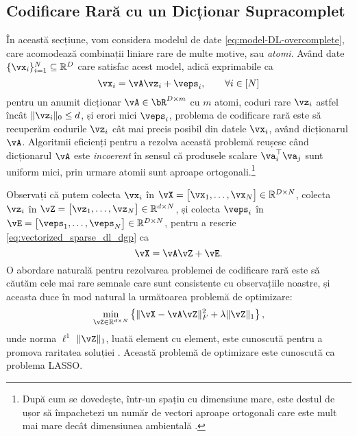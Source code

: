 \documentclass[../../book-main_ro.tex]{subfiles}
\begin{document}
\subsection{Codificare Rară cu un Dicționar Supracomplet} 

În această secțiune, vom considera modelul de date
\eqref{eq:model-DL-overcomplete}, care acomodează combinații liniare rare
de multe motive, sau \textit{atomi}. Având date \(\{\vx_{i}\}_{i = 1}^{N} \subseteq
\R^{D}\) care satisfac acest model, adică exprimabile ca
\begin{equation}\label{eq:vectorized_sparse_dl_dgp}
    \vx_{i} = \vA\vz_{i} + \veps_{i}, \qquad \forall i \in [N]
\end{equation}
pentru un anumit dicționar $\vA \in \bR^{D \times m}$ cu $m$ atomi, coduri rare
$\vz_i$ astfel încât $\norm{\vz_i}_0 \leq d$, și erori mici $\veps_i$,
problema de codificare rară este să recuperăm codurile $\vz_i$ cât mai precis
posibil din datele $\vx_i$, având dicționarul $\vA$.
Algoritmii eficienți pentru a rezolva această problemă reușesc când
dicționarul \(\vA\) este \textit{incoerent} în sensul că produsele
scalare \(\va_{i}^{\top}\va_{j}\) sunt uniform mici, prin urmare atomii sunt
aproape ortogonali.\footnote{După cum se dovedește, într-un spațiu cu dimensiune mare, este
destul de ușor să împachetezi un număr de vectori aproape ortogonali care este mult mai mare
decât dimensiunea ambientală \cite{Wright-Ma-2022}. } 


Observați că putem colecta \(\vx_{i}\) în \(\vX = \mat{\vx_{1}, \dots, \vx_{N}} \in \R^{D \times N}\), colecta \(\vz_{i}\) în \(\vZ = \mat{\vz_{1}, \dots, \vz_{N}} \in \R^{d  \times N}\), și colecta \(\veps_{i}\) în \(\vE = \mat{\veps_{1}, \dots, \veps_{N}} \in \R^{D \times N}\), pentru a rescrie \eqref{eq:vectorized_sparse_dl_dgp} ca 
\begin{equation}\label{eq:sparse_dl_dgp}
    \vX = \vA\vZ + \vE.
\end{equation}
O abordare naturală pentru rezolvarea problemei de codificare rară este să căutăm cele mai
rare semnale care sunt consistente cu observațiile noastre, și aceasta duce în mod natural la
următoarea problemă de optimizare:
\begin{equation}\label{eq:sparse_dl_lasso}
    \min_{\vZ \in \R^{d \times N}}\bc{\norm{\vX - \vA\vZ}_{F}^{2} + \lambda \norm{\vZ}_{1}},
\end{equation}
unde norma \(\ell^1\) \(\norm{\vZ}_{1}\), luată element cu element, este cunoscută pentru a promova raritatea soluției \cite{Wright-Ma-2022}. 
Această problemă de optimizare este cunoscută ca problema LASSO. 
\end{document}
